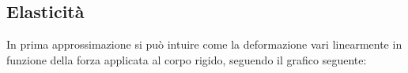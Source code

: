 \documentclass[a4paper]{extarticle}
\begin{document}
\vspace{1em}
\noindent
\subsection{Elasticità}
In prima approssimazione si può intuire come la deformazione vari linearmente in funzione della forza applicata al corpo rigido, seguendo il grafico seguente:

%
%
%
%
%
%
%
\end{document}
